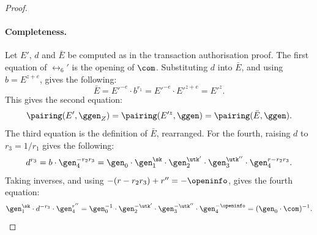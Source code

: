 \begin{proof}

  \paragraph{Completeness.} Let $E'$, $d$ and $\bar{E}$ be computed as in the
transaction authorisation proof. The first equation of $\rel_6'$ is the opening
of $\com$. Substituting $d$ into $\bar{E}$, and using $b = E^{z+e}$, gives the
following:
  \begin{equation*}
    \bar{E} = E'^{-e}\cdot b^{r_1} = E'^{-e}\cdot E'^{z+e} = E'^{z}.
  \end{equation*}
  This gives the second equation:
  \begin{equation*}
    \pairing(E',\ggen_Z) = \pairing(E'^{z},\ggen) = \pairing(\bar{E},\ggen).
  \end{equation*}
  The third equation is the definition of $\bar{E}$, rearranged. For the
fourth, raising $d$ to $r_3 = 1/r_1$ gives the following:
  \begin{equation*}
    d^{r_3} = b\cdot\gen_4^{-r_2 r_3} = \gen_0\cdot\gen_1^{\sk}\cdot
\gen_2^{\utk'}\cdot\gen_3^{\utk''} \cdot\gen_4^{r - r_2 r_3}.
  \end{equation*}
  Taking inverses, and using $-(r - r_2 r_3) + r'' = -\openinfo$, gives the
fourth equation:
  \begin{equation*}
    \gen_1^{\sk}\cdot d^{-r_3}\cdot\gen_4^{r''} =
\gen_0^{-1}\cdot\gen_2^{-\utk'}\cdot\gen_3^{-\utk''}\cdot\gen_4^{-\openinfo} =
(\gen_0\cdot\com)^{-1}.
  \end{equation*}


\end{proof}
